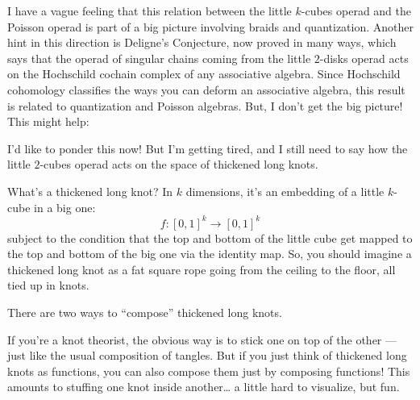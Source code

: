 \documentclass{article}
\def\tightlist{}
\renewcommand{\texttt}[1]{%
  \begingroup
  \ttfamily
  \begingroup\lccode`~=`/\lowercase{\endgroup\def~}{/\discretionary{}{}{}}%
  \begingroup\lccode`~=`[\lowercase{\endgroup\def~}{[\discretionary{}{}{}}%
  \begingroup\lccode`~=`.\lowercase{\endgroup\def~}{.\discretionary{}{}{}}%
  \catcode`/=\active\catcode`[=\active\catcode`.=\active
  \scantokens{#1\noexpand}%
  \endgroup
}
\begin{document}

I have a vague feeling that this relation between the little \(k\)-cubes
operad and the Poisson operad is part of a big picture involving braids
and quantization. Another hint in this direction is Deligne's
Conjecture, now proved in many ways, which says that the operad of
singular chains coming from the little \(2\)-disks operad acts on the
Hochschild cochain complex of any associative algebra. Since Hochschild
cohomology classifies the ways you can deform an associative algebra,
this result is related to quantization and Poisson algebras. But, I
don't get the big picture! This might help:


I'd like to ponder this now! But I'm getting tired, and I still need to
say how the little \(2\)-cubes operad acts on the space of thickened
long knots.

What's a thickened long knot? In \(k\) dimensions, it's an embedding of
a little \(k\)-cube in a big one: \[f\colon [0,1]^k \to [0,1]^k\]
subject to the condition that the top and bottom of the little cube get
mapped to the top and bottom of the big one via the identity map. So,
you should imagine a thickened long knot as a fat square rope going from
the ceiling to the floor, all tied up in knots.

There are two ways to ``compose'' thickened long knots.

If you're a knot theorist, the obvious way is to stick one on top of the
other --- just like the usual composition of tangles. But if you just
think of thickened long knots as functions, you can also compose them
just by composing functions! This amounts to stuffing one knot inside
another\ldots{} a little hard to visualize, but fun.
\end{document}
